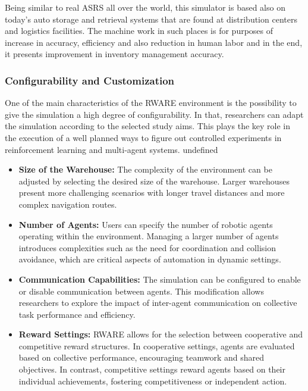 \documentclass[11pt]{article}
\begin{document}
Being similar to real ASRS all over the world, this simulator is based also on today’s auto storage and retrieval systems that are found at distribution centers and logistics facilities. The machine work in such places is for purposes of increase in accuracy, efficiency and also reduction in human labor and in the end, it presents improvement in inventory management accuracy.

\subsubsection{Configurability and Customization}
One of the main characteristics of the RWARE environment is the possibility to give the simulation a high degree of configurability. In that, researchers can adapt the simulation according to the selected study aims. This plays the key role in the execution of a well planned ways to figure out controlled experiments in reinforcement learning and multi-agent systems. undefined

\begin{itemize}
\item \textbf{Size of the Warehouse:} The complexity of the environment can be adjusted by selecting the desired size of the warehouse. Larger warehouses present more challenging scenarios with longer travel distances and more complex navigation routes.

\item \textbf{Number of Agents:} Users can specify the number of robotic agents operating within the environment. Managing a larger number of agents introduces complexities such as the need for coordination and collision avoidance, which are critical aspects of automation in dynamic settings.

\item \textbf{Communication Capabilities:} The simulation can be configured to enable or disable communication between agents. This modification allows researchers to explore the impact of inter-agent communication on collective task performance and efficiency.

\item \textbf{Reward Settings:} RWARE allows for the selection between cooperative and competitive reward structures. In cooperative settings, agents are evaluated based on collective performance, encouraging teamwork and shared objectives. In contrast, competitive settings reward agents based on their individual achievements, fostering competitiveness or independent action.
\end{itemize}
\end{document}
